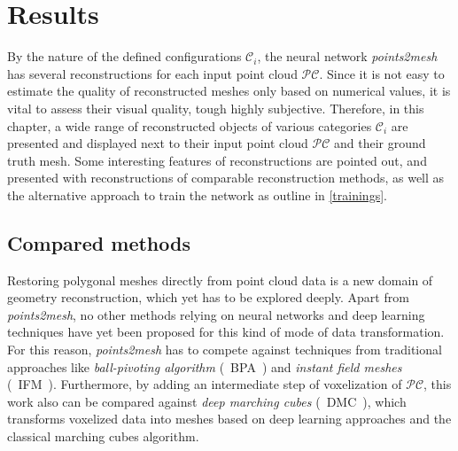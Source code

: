 \chapter{Results}
\label{chap:results}

    By the nature of the defined configurations $\mathcal{C}_i$, the neural network
    \emph{points2mesh} has several reconstructions for each input point cloud $\mathcal{PC}$.
    Since it is not easy to estimate the quality of reconstructed meshes only based on numerical
    values, it is vital to assess their visual quality, tough highly subjective.
    Therefore, in this chapter, a wide range of reconstructed objects of various categories $\mathcal{C}_i$
    are presented and displayed next to their input point cloud $\mathcal{PC}$ and their ground 
    truth mesh. Some interesting features of reconstructions are pointed out, and presented with reconstructions of comparable
    reconstruction methods, as well as the alternative approach to train the network as outline in \ref{trainings}.
    
\section{Compared methods}

Restoring polygonal meshes directly from point cloud data is a new domain of geometry reconstruction, 
which yet has to be explored deeply. Apart from \emph{points2mesh}, no other methods relying on neural 
networks and deep learning techniques have yet been proposed for this kind of mode of data transformation.
For this reason, \emph{points2mesh} has to compete against techniques from traditional approaches like
\emph{ball-pivoting algorithm} \cite{817351}(~BPA~) and \emph{instant field meshes} \cite{Jakob2015Instant} (~IFM~). Furthermore, by adding
an intermediate step of voxelization of $\mathcal{PC}$, this work also can be compared against 
\emph{deep marching cubes} \cite{Liao2018CVPR} (~DMC~), which transforms voxelized data into meshes based on deep learning approaches and the classical
marching cubes algorithm.

